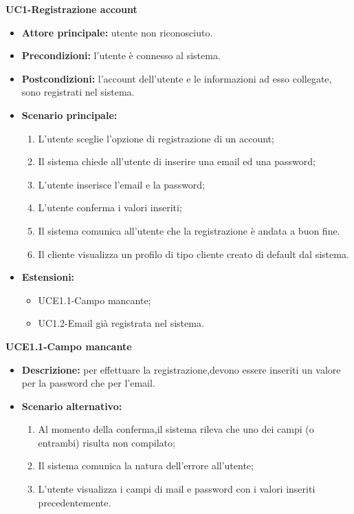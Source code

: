 \textbf{UC1-Registrazione account}
\begin{itemize}
    \item \textbf{Attore principale: }utente non riconosciuto.
    \item \textbf{Precondizioni: }l'utente è connesso al sistema.
    \item \textbf{Postcondizioni: }l'account dell'utente e le informazioni ad esso collegate, sono registrati nel sistema.
    \item \textbf{Scenario principale:} 
        \begin{enumerate}
            \item L'utente sceglie l'opzione di registrazione di un account;
            \item Il sistema chiede all'utente di inserire una email ed una password;
            \item L'utente inserisce l'email e la password;
            \item L'utente conferma i valori inseriti;
            \item Il sistema comunica all'utente che la registrazione è andata 
            a buon fine.
            \item Il cliente visualizza un profilo di tipo cliente creato di default dal sistema.
        \end{enumerate}
    \item \textbf{Estensioni:}
        \begin{itemize}
                \item UCE1.1-Campo mancante;
                \item UC1.2-Email già registrata nel sistema.
        \end{itemize}
\end{itemize}
    
\textbf{UCE1.1-Campo mancante}
\begin{itemize}
    \item \textbf{Descrizione: }per effettuare la registrazione,devono essere inseriti un valore per la password che per l'email.
    \item \textbf{Scenario alternativo:}
    \begin{enumerate}
        \item Al momento della conferma,il sistema rileva che uno dei campi (o entrambi) risulta non compilato;
        \item Il sistema comunica la natura dell'errore all'utente;
        \item L'utente visualizza i campi di mail e password con i valori inseriti precedentemente.
    \end{enumerate}
\end{itemize}

